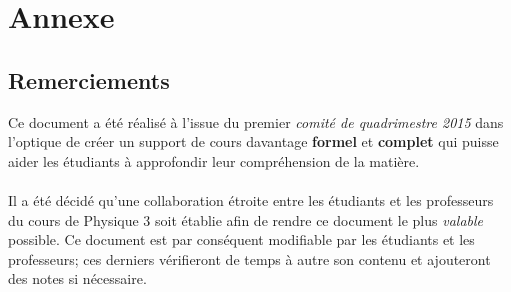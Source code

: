 \documentclass[a4paper,12pt]{article}
\begin{document}
\section{Annexe}


\subsection{Remerciements}

Ce document a été réalisé à l'issue du premier \textit{comité de quadrimestre 2015} dans l'optique de créer un support de cours 
davantage \textbf{formel} et \textbf{complet} qui puisse aider les étudiants à approfondir leur compréhension de la matière. \\ \\
Il a été décidé qu'une collaboration étroite entre les étudiants et les professeurs du cours de Physique 3 soit établie afin de rendre ce document 
le plus \textit{valable} possible. Ce document est par conséquent modifiable par les étudiants et les professeurs; ces derniers vérifieront de temps à autre 
son contenu et ajouteront des notes si nécessaire. 


\end{document}
